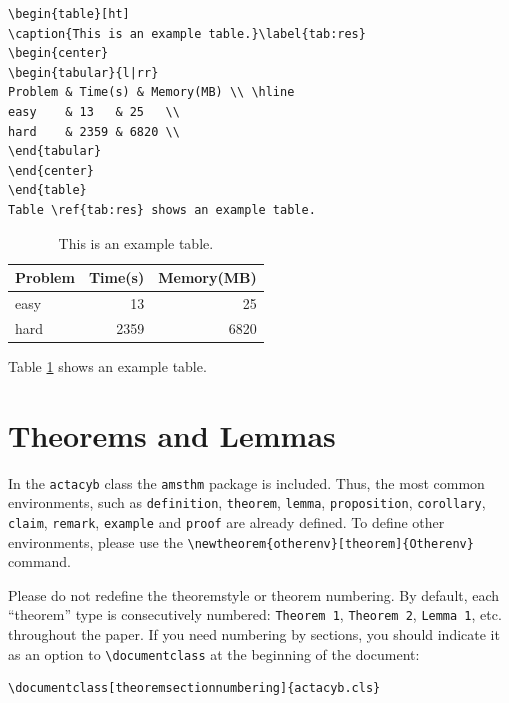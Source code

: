\documentclass[theoremcontinuousnumbering,withtitlethanks]{actacyb}
\begin{document}
\begin{verbatim}
\begin{table}[ht]
\caption{This is an example table.}\label{tab:res}
\begin{center}
\begin{tabular}{l|rr}
Problem & Time(s) & Memory(MB) \\ \hline
easy    & 13   & 25   \\
hard    & 2359 & 6820 \\
\end{tabular}
\end{center}
\end{table}
Table \ref{tab:res} shows an example table.
\end{verbatim}

\begin{table}[ht]
\caption{This is an example table.}\label{tab:res}
\begin{center}
\begin{tabular}{l|rr}
Problem & Time(s) & Memory(MB) \\ \hline
easy    & 13   & 25   \\
hard    & 2359 & 6820 \\
\end{tabular}
\end{center}
\end{table}
Table \ref{tab:res} shows an example table.


\section{Theorems and Lemmas}

In the \verb|actacyb| class the \verb|amsthm| package is included.
Thus, the most common environments, such as \verb|definition|, \verb|theorem|, \verb|lemma|,
\verb|proposition|, \verb|corollary|, \verb|claim|, \verb|remark|, \verb|example| and \verb|proof| are already defined.
To define other environments, please use the \verb|\newtheorem{otherenv}[theorem]{Otherenv}|  
command.

Please do not redefine the theoremstyle or theorem numbering. 
By default, each ``theorem'' type is consecutively numbered:
\texttt{Theorem 1}, \texttt{Theorem 2}, \texttt{Lemma 1}, etc.
throughout the paper.
If you need numbering by sections, you should indicate it as an option to
\verb|\documentclass| at the beginning of the document:

\begin{verbatim}
\documentclass[theoremsectionnumbering]{actacyb.cls}
\end{verbatim}
\end{document}
